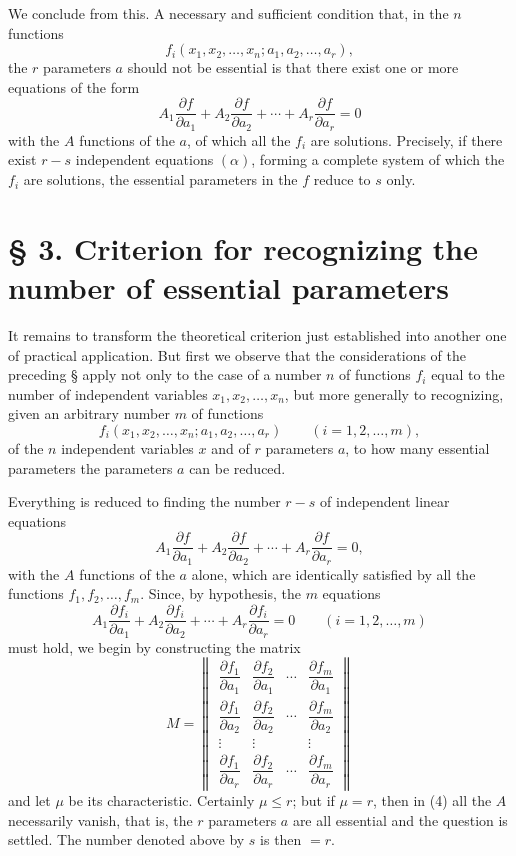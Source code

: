 \documentclass[11pt]{book}
\begin{document}
We conclude from this. A necessary and sufficient condition that, in the $n$ functions
\[
 f_i(x_1,x_2,\ldots,x_n; a_1,a_2,\ldots,a_r),
\]
the $r$ parameters $a$ should not be essential is that there exist one or more equations of the form
\begin{equation*}\tag{$\alpha$}
 A_1\frac{\partial f}{\partial a_1}+A_2\frac{\partial f}{\partial a_2}+\cdots+A_r\frac{\partial f}{\partial a_r}=0
\end{equation*}
with the $A$ functions of the $a$, of which all the $f_i$ are solutions. Precisely, if there exist $r-s$ independent equations $(\alpha)$, forming a complete system of which the $f_i$ are solutions, the essential parameters in the $f$ reduce to $s$ only.

\section*{\S{} 3. Criterion for recognizing the number of essential parameters}

It remains to transform the theoretical criterion just established into another one of practical application. But first we observe that the considerations of the preceding \S{} apply not only to the case of a number $n$ of functions $f_i$ equal to the number of independent variables $x_1,x_2,\ldots,x_n$, but more generally to recognizing, given an arbitrary number $m$ of functions
\[
 f_i(x_1,x_2,\ldots,x_n;a_1,a_2,\ldots,a_r)\qquad (i=1,2,\ldots,m),
\]
of the $n$ independent variables $x$ and of $r$ parameters $a$, to how many essential parameters the parameters $a$ can be reduced.

Everything is reduced to finding the number $r-s$ of independent linear equations
\[
 A_1\frac{\partial f}{\partial a_1}+A_2\frac{\partial f}{\partial a_2}+\cdots+A_r\frac{\partial f}{\partial a_r}=0,
\]
with the $A$ functions of the $a$ alone, which are identically satisfied by all the functions $f_1,f_2,\ldots,f_m$. Since, by hypothesis, the $m$ equations
\begin{equation*}\tag{4}
 A_1\frac{\partial f_i}{\partial a_1}+A_2\frac{\partial f_i}{\partial a_2}+\cdots+A_r\frac{\partial f_i}{\partial a_r}=0\qquad (i=1,2,\ldots,m)
\end{equation*}
must hold, we begin by constructing the matrix
\[
M=\left\|\begin{array}{cccc}
\dfrac{\partial f_1}{\partial a_1} & \dfrac{\partial f_2}{\partial a_1} & \cdots & \dfrac{\partial f_m}{\partial a_1}\\[0.65em]
\dfrac{\partial f_1}{\partial a_2} & \dfrac{\partial f_2}{\partial a_2} & \cdots & \dfrac{\partial f_m}{\partial a_2}\\
\vdots & \vdots & & \vdots\\
\dfrac{\partial f_1}{\partial a_r} & \dfrac{\partial f_2}{\partial a_r} & \cdots & \dfrac{\partial f_m}{\partial a_r}
\end{array}\right\|
\]
and let $\mu$ be its characteristic. Certainly $\mu\le r$; but if $\mu=r$, then in (4) all the $A$ necessarily vanish, that is, the $r$ parameters $a$ are all essential and the question is settled. The number denoted above by $s$ is then $=r$.
\end{document}
